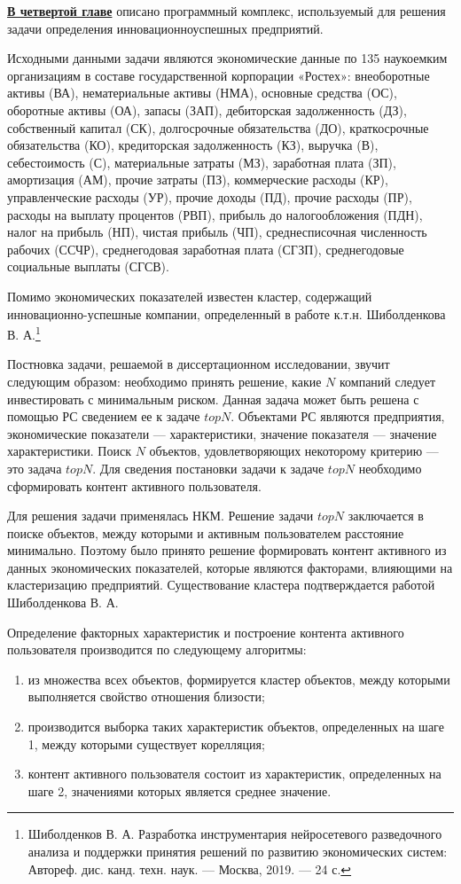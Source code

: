 
{\underline {\bf В четвертой главе}} описано программный комплекс,
используемый для решения задачи определения инновационноуспешных предприятий.

Исходными данными задачи являются экономические данные по 135
наукоемким организациям в составе государственной корпорации «Ростех»:
внеоборотные активы (ВА), нематериальные активы (НМА), основные средства (ОС), оборотные
активы (ОА), запасы (ЗАП), дебиторская задолженность (ДЗ), собственный капитал (СК),
долгосрочные обязательства (ДО), краткосрочные обязательства (КО), кредиторская
задолженность (КЗ), выручка (В), себестоимость (С), материальные затраты (МЗ),
заработная плата (ЗП), амортизация (АМ), прочие затраты (ПЗ), коммерческие расходы (КР),
управленческие расходы (УР), прочие доходы (ПД), прочие расходы (ПР), расходы на
выплату процентов (РВП), прибыль до налогообложения (ПДН), налог на прибыль (НП),
чистая прибыль (ЧП), среднесписочная численность рабочих (ССЧР), среднегодовая
заработная плата (СГЗП), среднегодовые социальные выплаты (СГСВ).

Помимо экономических показателей известен кластер, содержащий инно\-вационно-успешные
компании, определенный в работе к.т.н. Шиболденкова В. А.\footnote{
Шиболденков В. А. Разработка инструментария нейросетевого разведочного анализа и поддержки принятия решений по развитию экономических систем: Автореф. дис. канд. техн. наук. — Москва, 2019. — 24 с.
}

Постновка задачи, решаемой в диссертационном исследовании, звучит следующим образом:
необходимо принять решение, какие $N$ компаний следует инвестировать с минимальным риском.
Данная задача может быть решена с помощью РС сведением ее к задаче $topN$.
Объектами РС являются предприятия, экономические показатели --- характеристики, значение
показателя --- значение характеристики. Поиск $N$ объектов, удовлетворяющих некоторому критерию --- это задача $topN$.
Для сведения постановки задачи к задаче $topN$ необходимо сформировать контент активного пользователя.

Для решения задачи применялась НКМ. Решение задачи $topN$ заключается в поиске объектов, между которыми и активным пользователем
расстояние минимально. Поэтому было принято решение формировать контент активного из данных экономических показателей, которые
являются факторами, влияющими на кластеризацию предприятий. Существование кластера подтверждается работой Шиболденкова В. А. 

Определение факторных характеристик и построение контента активного пользователя производится по следующему алгоритмы:
\begin{enumerate}
\item из множества всех объектов, формируется кластер объектов, между которыми выполняется свойство отношения близости;
\item производится выборка таких характеристик объектов, определенных на шаге 1, между которыми существует корелляция;
\item контент активного пользователя состоит из характеристик, определенных на шаге 2, значениями которых является среднее значение.
\end{enumerate}

